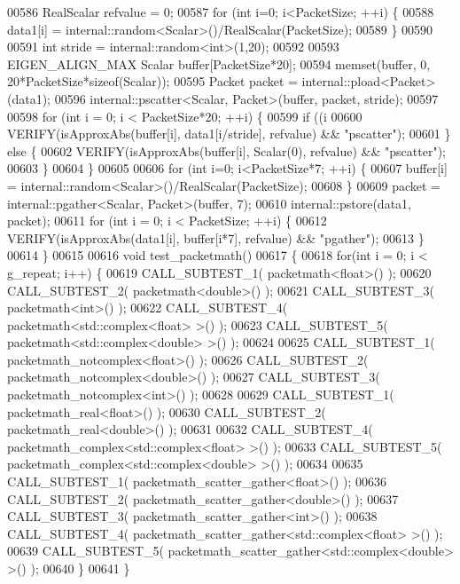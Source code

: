 \begin{DoxyCode}
00586   RealScalar refvalue = 0;
00587   \textcolor{keywordflow}{for} (\textcolor{keywordtype}{int} i=0; i<PacketSize; ++i) \{
00588     data1[i] = internal::random<Scalar>()/RealScalar(PacketSize);
00589   \}
00590 
00591   \textcolor{keywordtype}{int} stride = internal::random<int>(1,20);
00592 
00593   EIGEN\_ALIGN\_MAX Scalar buffer[PacketSize*20];
00594   memset(buffer, 0, 20*PacketSize*\textcolor{keyword}{sizeof}(Scalar));
00595   Packet packet = internal::pload<Packet>(data1);
00596   internal::pscatter<Scalar, Packet>(buffer, packet, stride);
00597 
00598   \textcolor{keywordflow}{for} (\textcolor{keywordtype}{int} i = 0; i < PacketSize*20; ++i) \{
00599     \textcolor{keywordflow}{if} ((i%
00600       VERIFY(isApproxAbs(buffer[i], data1[i/stride], refvalue) && \textcolor{stringliteral}{"pscatter"});
00601     \} \textcolor{keywordflow}{else} \{
00602       VERIFY(isApproxAbs(buffer[i], Scalar(0), refvalue) && \textcolor{stringliteral}{"pscatter"});
00603     \}
00604   \}
00605 
00606   \textcolor{keywordflow}{for} (\textcolor{keywordtype}{int} i=0; i<PacketSize*7; ++i) \{
00607     buffer[i] = internal::random<Scalar>()/RealScalar(PacketSize);
00608   \}
00609   packet = internal::pgather<Scalar, Packet>(buffer, 7);
00610   internal::pstore(data1, packet);
00611   \textcolor{keywordflow}{for} (\textcolor{keywordtype}{int} i = 0; i < PacketSize; ++i) \{
00612     VERIFY(isApproxAbs(data1[i], buffer[i*7], refvalue) && \textcolor{stringliteral}{"pgather"});
00613   \}
00614 \}
00615 
00616 \textcolor{keywordtype}{void} test\_packetmath()
00617 \{
00618   \textcolor{keywordflow}{for}(\textcolor{keywordtype}{int} i = 0; i < g\_repeat; i++) \{
00619     CALL\_SUBTEST\_1( packetmath<float>() );
00620     CALL\_SUBTEST\_2( packetmath<double>() );
00621     CALL\_SUBTEST\_3( packetmath<int>() );
00622     CALL\_SUBTEST\_4( packetmath<std::complex<float> >() );
00623     CALL\_SUBTEST\_5( packetmath<std::complex<double> >() );
00624 
00625     CALL\_SUBTEST\_1( packetmath\_notcomplex<float>() );
00626     CALL\_SUBTEST\_2( packetmath\_notcomplex<double>() );
00627     CALL\_SUBTEST\_3( packetmath\_notcomplex<int>() );
00628 
00629     CALL\_SUBTEST\_1( packetmath\_real<float>() );
00630     CALL\_SUBTEST\_2( packetmath\_real<double>() );
00631 
00632     CALL\_SUBTEST\_4( packetmath\_complex<std::complex<float> >() );
00633     CALL\_SUBTEST\_5( packetmath\_complex<std::complex<double> >() );
00634 
00635     CALL\_SUBTEST\_1( packetmath\_scatter\_gather<float>() );
00636     CALL\_SUBTEST\_2( packetmath\_scatter\_gather<double>() );
00637     CALL\_SUBTEST\_3( packetmath\_scatter\_gather<int>() );
00638     CALL\_SUBTEST\_4( packetmath\_scatter\_gather<std::complex<float> >() );
00639     CALL\_SUBTEST\_5( packetmath\_scatter\_gather<std::complex<double> >() );
00640   \}
00641 \}
\end{DoxyCode}
